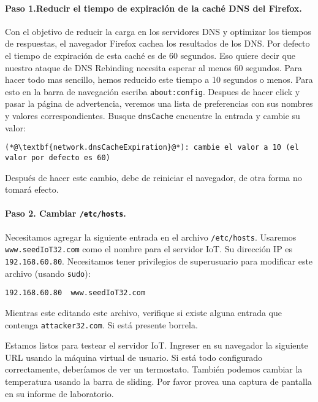\paragraph{Paso 1.Reducir el tiempo de expiración de la caché DNS del Firefox.}
Con el objetivo de reducir la carga en los servidores DNS y optimizar los tiempos de respuestas, el navegador Firefox cachea los resultados de los DNS. Por defecto el tiempo de expiración de esta caché es de 60 segundos. Eso quiere decir que nuestro ataque de DNS Rebinding necesita esperar al menos 60 segundos. Para hacer todo mas sencillo, hemos reducido este tiempo a 10 segundos o menos. Para esto en la barra de navegación escriba  \texttt{about:config}. 
Despues de hacer click y pasar la página de advertencia, veremos una lista de preferencias con sus nombres y valores correspondientes.
Busque \texttt{dnsCache} encuentre la entrada y cambie su valor:

\begin{lstlisting}
(*@\textbf{network.dnsCacheExpiration}@*): cambie el valor a 10 (el valor por defecto es 60)
\end{lstlisting}

Después de hacer este cambio, debe de reiniciar el navegador, de otra forma no tomará efecto.


\paragraph{Paso 2. Cambiar \texttt{/etc/hosts}.}
Necesitamos agregar la siguiente entrada en el archivo \texttt{/etc/hosts}. Usaremos \texttt{www.seedIoT32.com} como el nombre para el servidor IoT. Su dirección IP es \texttt{192.168.60.80}. 
Necesitamos tener privilegios de superusuario para modificar este archivo (usando \texttt{sudo}): 

\begin{lstlisting}
192.168.60.80  www.seedIoT32.com
\end{lstlisting}

Mientras este editando este archivo, verifique si existe alguna entrada que contenga \texttt{attacker32.com}. Si está presente borrela.

Estamos listos para testear el servidor IoT. Ingreser en su navegador la siguiente URL usando la máquina virtual de usuario. Si está todo configurado correctamente, deberíamos de ver un termostato. También podemos cambiar la temperatura usando la barra de sliding. Por favor provea una captura de pantalla en su informe de laboratorio.

